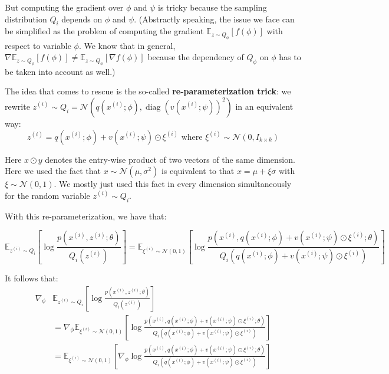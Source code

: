 But computing the gradient over $\phi$ and $\psi$ is tricky because the sampling
distribution $Q_i$ depends on $\phi$ and $\psi$. (Abstractly speaking, the issue we
face can be simplified as the problem of computing the gradient $\mathbb E_{z \sim Q_\phi} [f(\phi)]$
with respect to variable $\phi$. We know that in general, $\nabla \mathbb E_{z \sim Q_\phi} [f(\phi)] \ne
\mathbb E_{z \sim Q_\phi} [\nabla f(\phi)]$ because the dependency of $Q_\phi$ on $\phi$ has to be taken into
account as well.)

The idea that comes to rescue is the so-called \textbf{re-parameterization
trick}: we rewrite $z^{(i)} \sim Q_i = \mathcal N(q(x^{(i)} ;\phi),\operatorname{diag}(v(x^{(i)} ;\psi))^2)$ in an equivalent
way:
\begin{equation}
    z^{(i)} = q(x^{(i)} ;\phi) + v(x^{(i)} ;\psi) \odot \xi^{(i)} \text{ where } \xi^{(i)} \sim \mathcal N(0,I_{k \times k})
\end{equation}

Here $x \odot y$ denotes the entry-wise product of two vectors of the same
dimension. Here we used the fact that $x \sim \mathcal N(\mu,\sigma^2 )$ is equivalent to that
$x = \mu+\xi \sigma$ with $\xi \sim \mathcal N(0,1)$. We mostly just used this fact in every dimension
simultaneously for the random variable $z^{(i)} \sim Q_i$.

With this re-parameterization, we have that:
\begin{fullwidth}
\begin{equation}
    \mathbb E_{z^{(i)} \sim Q_i} \left[\log\frac{p(x^{(i)} ,z^{(i)} ;\theta)}{Q_i(z^{(i)})}\right]
        = \mathbb E_{\xi^{(i)} \sim\mathcal N(0,1)} \left[\log \frac{p(x^{(i)} ,q(x^{(i)} ;\phi) + v(x^{(i)} ;\psi) \odot \xi^{(i)} ;\theta)}{Q_i (q(x^{(i)} ;\phi) + v(x^{(i)} ;\psi) \odot \xi^{(i)} )}\right]
\end{equation}
\end{fullwidth}
It follows that:
\begin{align}
    \nabla_\phi& \mathbb E_{z^{(i)} \sim Q_i} \left[ \log\frac{p(x^{(i)} ,z^{(i)} ;\theta)}{Q_i(z^{(i)})}\right]\\
        &= \nabla_\phi \mathbb E_{\xi^{(i)} \sim\mathcal N(0,1)} \left[ \log\frac{p(x^{(i)} ,q(x^{(i)} ;\phi) + v(x^{(i)} ;\psi) \odot \xi^{(i)} ;\theta)}{Q_i (q(x^{(i)} ;\phi) + v(x^{(i)} ;\psi) \odot \xi^{(i)} )}\right]\\
        &= \mathbb E_{\xi^{(i)} \sim\mathcal N(0,1)} \left[\nabla_\phi \log \frac{p(x^{(i)} ,q(x^{(i)} ;\phi) + v(x^{(i)} ;\psi) \odot \xi^{(i)} ;\theta)}{Q_i (q(x^{(i)} ;\phi) + v(x^{(i)} ;\psi) \odot \xi^{(i)} )}\right]
\end{align}

